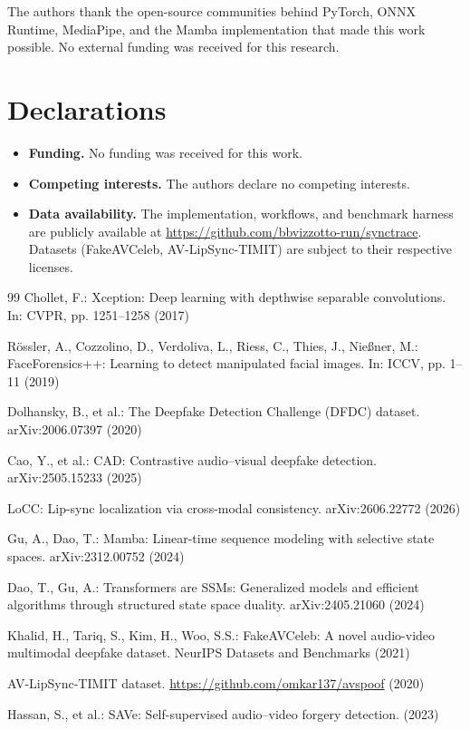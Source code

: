 \documentclass[sn-basic,Numbered,referee]{sn-jnl}
\begin{document}
The authors thank the open-source communities behind PyTorch, ONNX Runtime, MediaPipe, and the Mamba implementation that made this work possible. No external funding was received for this research.

\section*{Declarations}
\begin{itemize}
\item \textbf{Funding.} No funding was received for this work.
\item \textbf{Competing interests.} The authors declare no competing interests.
\item \textbf{Data availability.} The implementation, workflows, and benchmark harness are publicly available at \url{https://github.com/bbvizzotto-run/synctrace}. Datasets (FakeAVCeleb, AV-LipSync-TIMIT) are subject to their respective licenses.
\end{itemize}

\begin{thebibliography}{99}
 Chollet, F.: Xception: Deep learning with depthwise separable convolutions. In: CVPR, pp. 1251--1258 (2017)

 R{\"o}ssler, A., Cozzolino, D., Verdoliva, L., Riess, C., Thies, J., Nie{\ss}ner, M.: FaceForensics++: Learning to detect manipulated facial images. In: ICCV, pp. 1--11 (2019)

 Dolhansky, B., et al.: The Deepfake Detection Challenge (DFDC) dataset. arXiv:2006.07397 (2020)

 Cao, Y., et al.: CAD: Contrastive audio--visual deepfake detection. arXiv:2505.15233 (2025)

 LoCC: Lip-sync localization via cross-modal consistency. arXiv:2606.22772 (2026)

 Gu, A., Dao, T.: Mamba: Linear-time sequence modeling with selective state spaces. arXiv:2312.00752 (2024)

 Dao, T., Gu, A.: Transformers are SSMs: Generalized models and efficient algorithms through structured state space duality. arXiv:2405.21060 (2024)

 Khalid, H., Tariq, S., Kim, H., Woo, S.S.: FakeAVCeleb: A novel audio-video multimodal deepfake dataset. NeurIPS Datasets and Benchmarks (2021)

 AV-LipSync-TIMIT dataset. \url{https://github.com/omkar137/avspoof} (2020)

 Hassan, S., et al.: SAVe: Self-supervised audio--video forgery detection. (2023)

\end{thebibliography}
\end{document}
